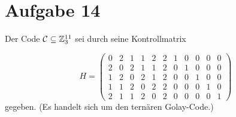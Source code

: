 \section*{Aufgabe 14}
Der Code $\mathcal{C} \subseteq \mathbb{Z}^{11}_3$ sei durch seine Kontrollmatrix

\begin{equation*}
	H =
	\begin{pmatrix}
	0 & 2 & 1 & 1 & 2 & 2 & 1 & 0 & 0 & 0 & 0 \\
	2 & 0 & 2 & 1 & 1 & 2 & 0 & 1 & 0 & 0 & 0 \\
	1 & 2 & 0 & 2 & 1 & 2 & 0 & 0 & 1 & 0 & 0 \\
	1 & 1 & 2 & 0 & 2 & 2 & 0 & 0 & 0 & 1 & 0 \\
	2 & 1 & 1 & 2 & 0 & 2 & 0 & 0 & 0 & 0 & 1
	\end{pmatrix}
\end{equation*}
gegeben.
(Es handelt sich um den ternären Golay-Code.)
